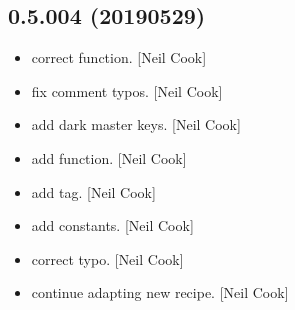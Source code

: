\documentclass[a4paper,10pt,english]{report}
\begin{document}
\subsection{0.5.004 (2019\sphinxhyphen{}05\sphinxhyphen{}29)}
\label{\detokenize{misc/changelog:id152}}\begin{itemize}
\item {} 
 \sphinxhyphen{} correct  function. {[}Neil Cook{]}

\item {} 
 \sphinxhyphen{} fix comment typos. {[}Neil Cook{]}

\item {} 
 \sphinxhyphen{} add dark master keys. {[}Neil Cook{]}

\item {} 
 \sphinxhyphen{} add  function. {[}Neil Cook{]}

\item {} 
 \sphinxhyphen{} add  tag. {[}Neil Cook{]}

\item {} 
 \sphinxhyphen{} add  constants. {[}Neil Cook{]}

\item {} 
 \sphinxhyphen{} correct typo. {[}Neil Cook{]}

\item {} 
 \sphinxhyphen{} continue adapting new recipe. {[}Neil Cook{]}

\end{itemize}
\end{document}
